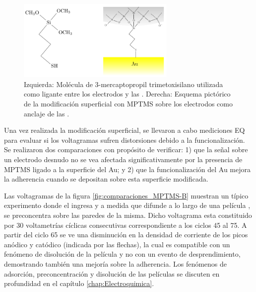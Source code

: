 			 \begin{figure}[!h]
							\begin{center}
							\includegraphics[width=0.68\textwidth]{Esquemas/mod_sup.pdf}
							\caption[Modificación superficial de los electrodos.]{Izquierda: Molécula de  3-mercaptopropil trimetoxisilano utilizada como ligante entre los electrodos y las \pdm. Derecha: Esquema pictórico de la modificación superficial con MPTMS sobre los electrodos como anclaje de las \pdm.}
							\label{fig:mod_sup}
							\end{center}
							\end{figure}
		
			 Una vez realizada la modificación superficial, se llevaron a cabo mediciones EQ para evaluar si los voltagramas sufren distorsiones debido a la funcionalización. Se realizaron dos comparaciones con propósito de verificar: 1) que la señal sobre un electrodo desnudo no se vea afectada significativamente por la presencia de MPTMS ligado a la superficie del Au; y 2) que la funcionalización del Au mejora la adherencia cuando se depositan \pdm\space sobre esta superficie modificada.

             Las voltagramas de la figura \ref{fig:comparaciones_MPTMS-B} muestran un típico experimento donde el \aminorutenio\space ingresa y a medida que difunde a lo largo de una película \pdmF, se preconcentra sobre las paredes de la misma. Dicho voltagrama esta constituido por 30 voltametrías cíclicas consecutivas correspondiente a los ciclos 45 al 75. A partir del ciclo 65 se ve una disminución en la densidad de corriente de los picos anódico y catódico (indicada por las flechas), la cual es compatible con un fenómeno de disolución de la película y no con un evento de desprendimiento, demostrando también una mejoría sobre la adherencia. Los fenómenos de adsorción, preconcentración y disolución de las películas se discuten en profundidad en el capítulo \ref{chap:Electroquimica}.


